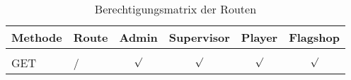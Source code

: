 \begin{table}
	\centering
	\begin{tabular}{l l c c c c}
		Methode & Route	& Admin & Supervisor & Player  & Flagshop \\ [0.5ex]
		\hline &&&&&\\
		GET & /	&  $\surd$ &  $\surd$  &  $\surd$ &  $\surd$ \\
	\end{tabular}
	\caption{Berechtigungsmatrix der Routen}
	\label{table:gis-permission}
\end{table}